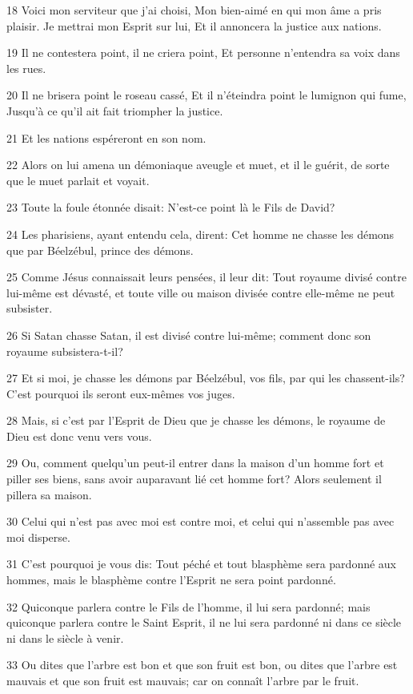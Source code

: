 \par 18 Voici mon serviteur que j'ai choisi, Mon bien-aimé en qui mon âme a pris plaisir. Je mettrai mon Esprit sur lui, Et il annoncera la justice aux nations.
\par 19 Il ne contestera point, il ne criera point, Et personne n'entendra sa voix dans les rues.
\par 20 Il ne brisera point le roseau cassé, Et il n'éteindra point le lumignon qui fume, Jusqu'à ce qu'il ait fait triompher la justice.
\par 21 Et les nations espéreront en son nom.
\par 22 Alors on lui amena un démoniaque aveugle et muet, et il le guérit, de sorte que le muet parlait et voyait.
\par 23 Toute la foule étonnée disait: N'est-ce point là le Fils de David?
\par 24 Les pharisiens, ayant entendu cela, dirent: Cet homme ne chasse les démons que par Béelzébul, prince des démons.
\par 25 Comme Jésus connaissait leurs pensées, il leur dit: Tout royaume divisé contre lui-même est dévasté, et toute ville ou maison divisée contre elle-même ne peut subsister.
\par 26 Si Satan chasse Satan, il est divisé contre lui-même; comment donc son royaume subsistera-t-il?
\par 27 Et si moi, je chasse les démons par Béelzébul, vos fils, par qui les chassent-ils? C'est pourquoi ils seront eux-mêmes vos juges.
\par 28 Mais, si c'est par l'Esprit de Dieu que je chasse les démons, le royaume de Dieu est donc venu vers vous.
\par 29 Ou, comment quelqu'un peut-il entrer dans la maison d'un homme fort et piller ses biens, sans avoir auparavant lié cet homme fort? Alors seulement il pillera sa maison.
\par 30 Celui qui n'est pas avec moi est contre moi, et celui qui n'assemble pas avec moi disperse.
\par 31 C'est pourquoi je vous dis: Tout péché et tout blasphème sera pardonné aux hommes, mais le blasphème contre l'Esprit ne sera point pardonné.
\par 32 Quiconque parlera contre le Fils de l'homme, il lui sera pardonné; mais quiconque parlera contre le Saint Esprit, il ne lui sera pardonné ni dans ce siècle ni dans le siècle à venir.
\par 33 Ou dites que l'arbre est bon et que son fruit est bon, ou dites que l'arbre est mauvais et que son fruit est mauvais; car on connaît l'arbre par le fruit.
